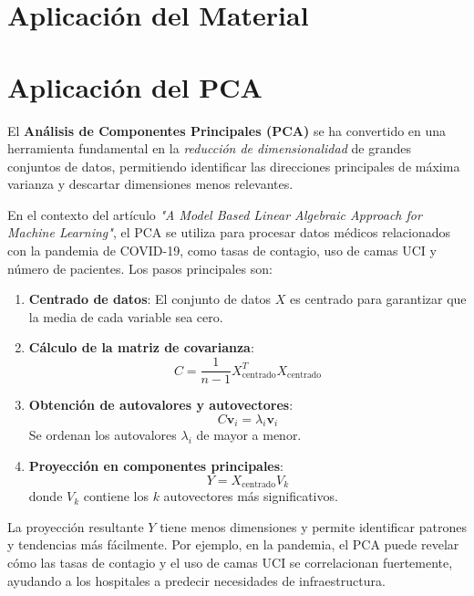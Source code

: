 \documentclass[12pt]{article}
\begin{document}
        \section{Aplicación del Material}
        \section*{Aplicación del PCA}
        \noindent
        El \textbf{Análisis de Componentes Principales (PCA)} se ha convertido en una herramienta fundamental en la \emph{reducción de dimensionalidad} de grandes conjuntos de datos, permitiendo identificar las direcciones principales de máxima varianza y descartar dimensiones menos relevantes.
        
        \vspace{1em}
        \noindent
        En el contexto del artículo \emph{"A Model Based Linear Algebraic Approach for Machine Learning"}, el PCA se utiliza para procesar datos médicos relacionados con la pandemia de COVID-19, como tasas de contagio, uso de camas UCI y número de pacientes. Los pasos principales son:
        \begin{enumerate}
                \item \textbf{Centrado de datos}: El conjunto de datos $ X $ es centrado para garantizar que la media de cada variable sea cero.
                \item \textbf{Cálculo de la matriz de covarianza}:
                \[
                C = \frac{1}{n-1} X_{\text{centrado}}^T X_{\text{centrado}}
                \]
                \item \textbf{Obtención de autovalores y autovectores}: 
                \[
                C \mathbf{v}_i = \lambda_i \mathbf{v}_i
                \]
                Se ordenan los autovalores $\lambda_i$ de mayor a menor.
                \item \textbf{Proyección en componentes principales}:
                \[
                Y = X_{\text{centrado}} V_k
                \]
                donde $ V_k $ contiene los $ k $ autovectores más significativos.
        \end{enumerate}
        
        \vspace{1em}
        \noindent
        La proyección resultante $ Y $ tiene menos dimensiones y permite identificar patrones y tendencias más fácilmente. Por ejemplo, en la pandemia, el PCA puede revelar cómo las tasas de contagio y el uso de camas UCI se correlacionan fuertemente, ayudando a los hospitales a predecir necesidades de infraestructura.
        
\end{document}
